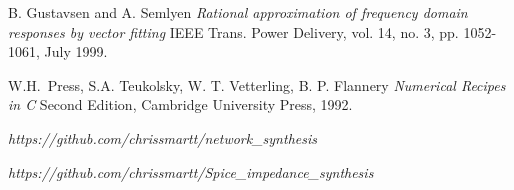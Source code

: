 \begin{thebibliography}{9}

B. Gustavsen and A. Semlyen
\textsl{Rational approximation of frequency domain responses by vector fitting}
IEEE Trans. Power Delivery, vol. 14, no. 3, pp. 1052-1061, July 1999.

W.H.~Press, S.A. Teukolsky, W. T. Vetterling, B. P. Flannery
\textsl{Numerical Recipes in C} 
Second Edition, Cambridge University Press, 1992.

\textsl{https://github.com/chrissmartt/network\_synthesis}

\textsl{https://github.com/chrissmartt/Spice\_impedance\_synthesis}

\end{thebibliography}


